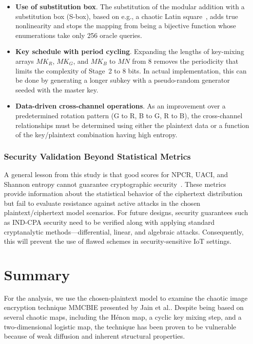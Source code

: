 \begin{itemize}
    \item \textbf{Use of substitution box}. The substitution of the modular
    addition with a substitution box (S-box), based on e.g., a chaotic Latin
    square~\cite{hua2021sbox}, adds true nonlinearity and stops the mapping
    from being a bijective function whose enumerations take only 256 oracle
    queries.

    \item \textbf{Key schedule with period cycling}. Expanding the lengths
    of key-mixing arrays $MK_R$, $MK_G$, and $MK_B$ to $MN$ from 8 removes
    the periodicity that limits the complexity of Stage~2 to 8 bits. In
    actual implementation, this can be done by generating a longer subkey with
    a pseudo-random generator seeded with the master key.

    \item \textbf{Data-driven cross-channel operations}. As an improvement
    over a predetermined rotation pattern (G to R, B to G, R to B), the
    cross-channel relationships must be determined using either the plaintext
    data or a function of the key/plaintext combination having high entropy.
\end{itemize}
\subsubsection{Security Validation Beyond Statistical Metrics}

A general lesson from this study is that good scores for NPCR, UACI, and
Shannon entropy cannot guarantee cryptographic security~\cite{wen2023cryptanalysis}.
These metrics provide information about the statistical behavior of the
ciphertext distribution but fail to evaluate resistance against active attacks in
the chosen plaintext/ciphertext model scenarios. For future designs, security
guarantees such as IND-CPA security need to be verified along with applying
standard cryptanalytic methods---differential, linear, and algebraic attacks.
Consequently, this will prevent the use of flawed schemes in security-sensitive IoT
settings.


\section{Summary}

For the analysis, we use the chosen-plaintext model to examine the chaotic image encryption technique MMCBIE presented by Jain et al.\cite{jain2024mmcbie}. Despite being based on several chaotic maps, including the H\'enon map, a cyclic key mixing step, and a two-dimensional logistic map, the technique has been proven to be vulnerable because of weak diffusion and inherent structural properties.

